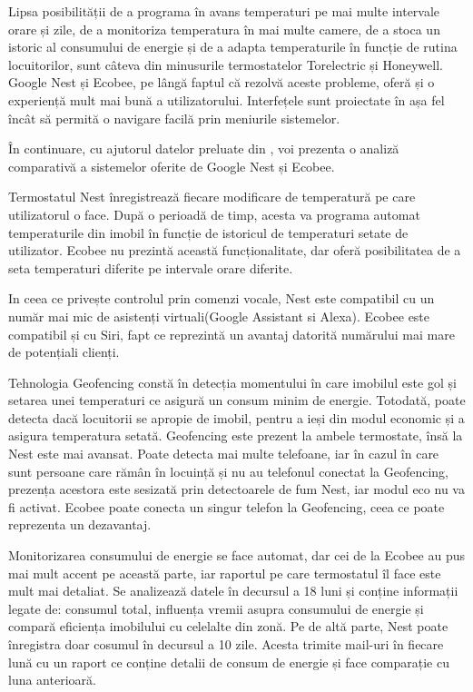 	Lipsa posibilității de a programa în avans temperaturi pe mai multe intervale orare și zile, de a monitoriza temperatura în mai multe camere, de a stoca un istoric al consumului de energie și de a adapta temperaturile în funcție de rutina locuitorilor, sunt câteva din minusurile termostatelor Torelectric și Honeywell. Google Nest și Ecobee, pe lângă faptul că rezolvă aceste probleme, oferă și o experiență mult mai bună a utilizatorului. Interfețele sunt proiectate în așa fel încât să permită o navigare facilă prin meniurile sistemelor.  

	În continuare, cu ajutorul datelor preluate din \cite{ecobeeVSnest}, voi prezenta o analiză comparativă a sistemelor oferite de Google Nest și Ecobee. 

	Termostatul Nest înregistrează fiecare modificare de temperatură pe care utilizatorul o face. După o perioadă de timp, acesta va programa automat temperaturile din imobil în funcție de istoricul de temperaturi setate de utilizator. Ecobee nu prezintă această funcționalitate, dar oferă posibilitatea de a seta temperaturi diferite pe intervale orare diferite. 

	In ceea ce privește controlul prin comenzi vocale, Nest este compatibil cu un număr mai mic de asistenți virtuali(Google Assistant si Alexa). Ecobee este compatibil și cu Siri, fapt ce reprezintă un avantaj datorită numărului mai mare de potențiali clienți. 

	Tehnologia Geofencing constă în detecția momentului în care imobilul este gol și setarea unei temperaturi ce asigură un consum minim de energie. Totodată, poate detecta dacă locuitorii se apropie de imobil, pentru a ieși din modul economic și a asigura temperatura setată. Geofencing este prezent la ambele termostate, însă la Nest este mai avansat. Poate detecta mai multe telefoane, iar în cazul în care sunt persoane care rămân în locuință și nu au telefonul conectat la Geofencing, prezența acestora este sesizată prin detectoarele de fum Nest, iar modul eco nu va fi activat. Ecobee poate conecta un singur telefon la Geofencing, ceea ce poate reprezenta un dezavantaj.

	  Monitorizarea consumului de energie se face automat, dar cei de la Ecobee au pus mai mult accent pe această parte, iar raportul pe care termostatul îl face este mult mai detaliat. Se analizează datele în decursul a 18 luni și conține informații legate de: consumul total, influența vremii asupra consumului de energie și compară eficiența imobilului cu celelalte din zonă. Pe de altă parte, Nest poate înregistra doar cosumul în decursul a 10 zile. Acesta trimite mail-uri în fiecare lună cu un raport ce conține detalii de consum de energie și face comparație cu luna anterioară.

